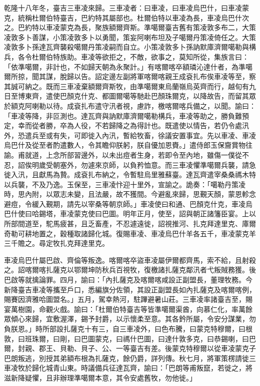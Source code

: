 \begin{pinyinscope}
乾隆十八年冬，臺吉三車凌來歸。三車凌者：曰車凌，曰車凌烏巴什，曰車凌蒙克，統稱杜爾伯特臺吉，巴約特其屬部也。杜爾伯特以車凌為長，車凌烏巴什次之。巴約特以車凌蒙克為長，聚族額爾齊斯。準噶爾臺吉舊有策凌敦多布二，大策凌敦多卜善謀，小策凌敦多卜以勇聞，策妄阿喇布坦及子噶爾丹策凌倚任之。大策凌敦多卜孫達瓦齊襲殺噶爾丹策凌嗣而自立。小策凌敦多卜孫訥默庫濟爾噶勒與構兵，各令杜爾伯特族助。車凌等欲拒之，不敵，欲事之，莫知所從，集族言曰：「依準噶爾，非計也，不如歸天朝為永聚計。」有喀爾喀卒額璘沁達什者，為準噶爾所掠，聞其謀，脫歸以告。詔定邊左副將軍喀爾喀親王成袞扎布俟車凌等至，察其誠可納之。既而三車凌棄額爾齊斯牧，由準噶爾東烏蘭嶺烏英齊而行，越旬有九日至博東齊，遣使巴顏克什克、都圖爾噶等馳赴巴顏珠爾克，以降故告，而留其眾於額克阿喇勒以待。成袞扎布遣守汛者視，慮詐，檄喀爾喀兵備之，以聞。諭曰：「車凌等降，非叵測也。達瓦齊與訥默庫濟爾噶勒構兵，車凌等助之，勝負難預定，幸而從者勝，卒為人役，不若歸降之為得計也。既遣使以情告，若仍令處汛外，恐遣兵至或有失，可即徙入內汛，暫給牧畜，徐議安置事宜。先以車凌、車凌烏巴什及從至者酌遣數人，令其瞻仰朕躬，朕自優加恩賚。」遣侍郎玉保齎賞物往諭。甫就道，上念所部習邊外，以未出痘者生身，若即令至內地，雖傷一僕從不忍，詔俟明歲受朝塞外，勿遽來京師，以負矜恤意。而三車凌懼準噶爾兵襲，請急徙入汛，且獻馬為贄。成袞扎布納之，令暫駐烏里雅蘇臺。達瓦齊遣宰桑桑禡木特以兵襲，不及乃逸。玉保至，三車凌忭迎十里外，宣諭之。詭奏：「噶勒丹策凌時，思內附，以眾志未變，且法嚴，故不獲間。今避亂來歸，思覲天顏，蒙恩軫念避痘，令緩入覲期，請先以宰桑等朝京師。」車凌使曰和通、巴顏克什克，車凌烏巴什使曰哈錫塔，車凌蒙克使曰巴圖。明年正月，使至，詔與朝正諸籓臣宴。上以所部間道至，駝馬疲甚，且乏畜產，不忍遽遠徙，詔視推河、扎克拜達里克、庫爾奇勒可耕地置之，穀種取諸歸化城。復賜車凌、車凌烏巴什羊各五千，車凌蒙克羊三千贍之。尋定牧扎克拜達里克。

車凌烏巴什屬巴啟、齊倫等叛逸。喀爾喀卒盜車凌屬伊爾都齊馬，索不給，且射殺之。詔喀爾喀扎薩克以鄂爾坤防秋兵百視牧，復檄諸扎薩克鄰汛者弋叛賊務獲。後巴啟等就擒論罪。四月，諭曰：「內扎薩克及喀爾喀咸設正副盟長，董理牧務。今新降臺吉車凌等攜至戶口，悉編旗分佐領，其設正副盟長如內扎薩克及喀爾喀例，賜賽因濟雅哈圖盟名。」五月，駕幸熱河，駐蹕避暑山莊。三車凌率諸臺吉至，賜宴萬樹園，命觀火戲。諭曰：「杜爾伯特臺吉等皆準噶爾渠酋，向慕仁化，率萬餘眾傾心來歸，宜敷渥澤，錫予封爵，以示懷柔至意。其各鈐所屬，令安分謀業，勿負朕恩。」時所部設扎薩克十有三，自三車凌外，曰色布騰，曰蒙克特穆爾，曰根敦，曰班珠爾，曰剛，曰巴圖蒙克，曰禡什巴圖，曰達什敦多克，曰恭錫喇，曰巴爾，封親、郡王、貝勒、貝子、公、一等臺吉有差。後蒙克特穆爾以從車凌蒙克子巴朗叛逃，別授其弟額布根為扎薩克，餘仍爵，詳列傳。秋七月，將軍策楞請徙三車凌牧於歸化城青山東。時議備兵征達瓦齊，諭曰：「巴朗等甫叛竄，若徙之，將滋新降疑懼，且非辦理準噶爾本意，其令安處舊牧，勿他徙。」


\end{pinyinscope}
